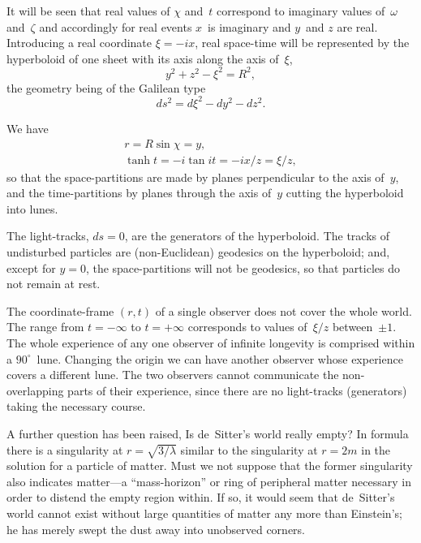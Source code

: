 \documentclass[12pt]{book}
\begin{document}
It will be seen that real values of $\chi$ and~$t$ correspond to imaginary
values of~$\omega$ and~$\zeta$ and accordingly for real events $x$~is imaginary and $y$~and
$z$ are real. Introducing a real coordinate $\xi = -ix$, real space-time will be
represented by the hyperboloid of one sheet with its axis along the axis of~$\xi$,
\[
y^{2} + z^{2} - \xi^{2} = R^{2},
\]
the geometry being of the Galilean type
\[
ds^{2} = d\xi^{2} - dy^{2} - dz^{2}.
\]

We have
\begin{gather*}
  r = R\sin\chi = y, \\
  \tanh t = -i\tan it = -ix/z = \xi/z,
\end{gather*}
so that the space\hyp{}partitions are made by planes perpendicular to the axis of~$y$,
and the time\hyp{}partitions by planes through the axis of~$y$ cutting the hyperboloid
into lunes.

The light-tracks, $ds = 0$, are the generators of the hyperboloid. The tracks
of undisturbed particles are (non\hyp{}Euclidean) geodesics on the hyperboloid;
and, except for $y = 0$, the space\hyp{}partitions will not be geodesics, so that
particles do not remain at rest.

The coordinate\hyp{}frame $(r, t)$ of a single observer does not cover the whole
world. The range from $t = -\infty$ to $t = +\infty$ corresponds to values of~$\xi/z$
between~$\pm1$. The whole experience of any one observer of infinite longevity
is comprised within a $90^{\circ}$~lune. Changing the origin we can have another
observer whose experience covers a different lune. The two observers cannot
communicate the non\hyp{}overlapping parts of their experience, since there are
no light-tracks (generators) taking the necessary course.

A further question has been raised, Is de~Sitter's world really empty? In
%
%
formula~ there is a singularity at $r = \sqrt{3/\lambda}$ similar to the singularity
at $r = 2m$ in the solution for a particle of matter. Must we not suppose that
the former singularity also indicates matter---a ``mass\hyp{}horizon'' or ring of
peripheral matter necessary in order to distend the empty region within. If
so, it would seem that de~Sitter's world cannot exist without large quantities
of matter any more than Einstein's; he has merely swept the dust away into
unobserved corners.
\end{document}
